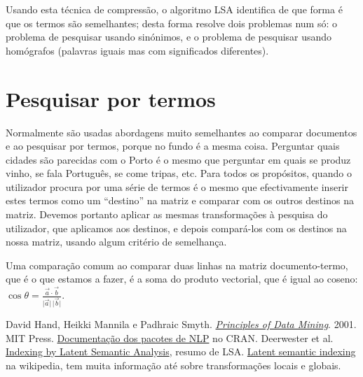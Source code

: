 \documentclass[twocolumn]{article}
\newcommand{\norm}[1]{\lvert #1 \rvert}
\begin{document}
Usando esta técnica de compressão, o algoritmo LSA identifica de que forma é que os termos são semelhantes; desta forma resolve dois problemas num só: o problema de pesquisar usando sinónimos, e o problema de pesquisar usando homógrafos (palavras iguais mas com significados diferentes).

\section{Pesquisar por termos}
\label{query}

Normalmente são usadas abordagens muito semelhantes ao comparar documentos e ao pesquisar por termos, porque no fundo é a mesma coisa. Perguntar quais cidades são parecidas com o Porto é o mesmo que perguntar em quais se produz vinho, se fala Português, se come tripas, etc. Para todos os propósitos, quando o utilizador procura por uma série de termos é o mesmo que efectivamente inserir estes termos como um ``destino'' na matriz e comparar com os outros destinos na matriz. Devemos portanto aplicar as mesmas transformações à pesquisa do utilizador, que aplicamos aos destinos, e depois compará-los com os destinos na nossa matriz, usando algum critério de semelhança.

Uma comparação comum ao comparar duas linhas na matriz documento-termo, que é o que estamos a fazer, é a soma do produto vectorial, que é igual ao coseno: $\cos \theta = \frac{\vec{a} \cdot \vec{b}}{\norm{\vec{a}} \, \norm{\vec{b}}}$.

\begin{thebibliography}{99}
 David Hand, Heikki Mannila e Padhraic Smyth. \href{ftp://gamma.sbin.org/pub/doc/books/Principles_of_Data_Mining.pdf}{\emph{Principles of Data Mining}}. 2001. MIT Press.
 \href{http://cran.r-project.org/web/views/NaturalLanguageProcessing.html
}{Documentação dos pacotes de NLP} no CRAN.
 Deerwester et al. \href{http://lsa.colorado.edu/papers/JASIS.lsi.90.pdf}{Indexing by Latent Semantic Analysis}, resumo de LSA.
 \href{http://en.wikibooks.org/wiki/LaTeX/Bibliography_Management}{Latent semantic indexing} na wikipedia, tem muita informação até sobre transformações locais e globais.
\end{thebibliography}
\end{document}
